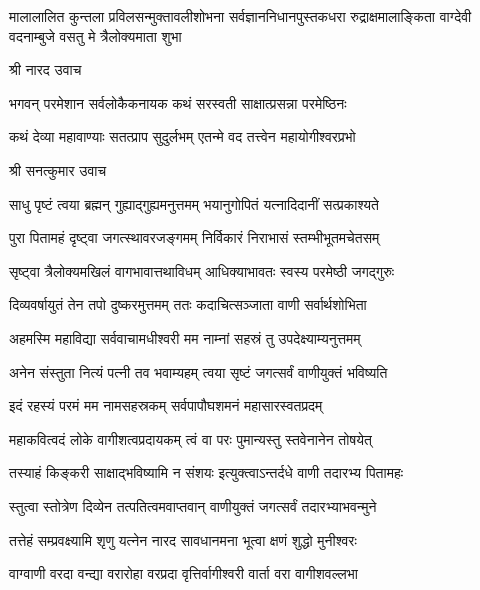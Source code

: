
{मालालालित कुन्तला प्रविलसन्मुक्तावलीशोभना}
{सर्वज्ञाननिधानपुस्तकधरा रुद्राक्षमालाङ्किता}
{वाग्देवी वदनाम्बुजे वसतु मे त्रैलोक्यमाता शुभा}

श्री नारद उवाच\nopagebreak[4]

\twolineshloka
{भगवन् परमेशान सर्वलोकैकनायक}
{कथं सरस्वती साक्षात्प्रसन्ना परमेष्ठिनः}%

\twolineshloka
{कथं देव्या महावाण्याः सतत्प्राप सुदुर्लभम्}
{एतन्मे वद तत्त्वेन महायोगीश्वरप्रभो}%


श्री सनत्कुमार उवाच\nopagebreak[4]

\twolineshloka
{साधु पृष्टं त्वया ब्रह्मन् गुह्याद्गुह्यमनुत्तमम्}
{भयानुगोपितं यत्नादिदानीं सत्प्रकाश्यते}%

\twolineshloka
{पुरा पितामहं दृष्ट्वा जगत्स्थावरजङ्गमम्}
{निर्विकारं निराभासं स्तम्भीभूतमचेतसम्}%

\twolineshloka
{सृष्ट्वा त्रैलोक्यमखिलं वागभावात्तथाविधम्}
{आधिक्याभावतः स्वस्य परमेष्ठी जगद्गुरुः}%

\twolineshloka
{दिव्यवर्षायुतं तेन तपो दुष्करमुत्तमम्}
{ततः कदाचित्सञ्जाता वाणी सर्वार्थशोभिता}%

\twolineshloka
{अहमस्मि महाविद्या सर्ववाचामधीश्वरी}
{मम नाम्नां सहस्रं तु उपदेक्ष्याम्यनुत्तमम्}%

\twolineshloka
{अनेन संस्तुता नित्यं पत्नी तव भवाम्यहम्}
{त्वया सृष्टं जगत्सर्वं वाणीयुक्तं भविष्यति}%

\twolineshloka
{इदं रहस्यं परमं मम नामसहस्रकम्}
{सर्वपापौघशमनं महासारस्वतप्रदम्}%

\twolineshloka
{महाकवित्वदं लोके वागीशत्वप्रदायकम्}
{त्वं वा परः पुमान्यस्तु स्तवेनानेन तोषयेत्}%

\twolineshloka
{तस्याहं किङ्करी साक्षाद्भविष्यामि न संशयः}
{इत्युक्त्वाऽन्तर्दधे वाणी तदारभ्य पितामहः}%

\twolineshloka
{स्तुत्वा स्तोत्रेण दिव्येन तत्पतित्वमवाप्तवान्}
{वाणीयुक्तं जगत्सर्वं तदारभ्याभवन्मुने}%

\twolineshloka
{तत्तेहं सम्प्रवक्ष्यामि शृणु यत्नेन नारद}
{सावधानमना भूत्वा क्षणं शुद्धो मुनीश्वरः}%




 \resetShloka


\twolineshloka
{वाग्वाणी वरदा वन्द्या वरारोहा वरप्रदा}
{वृत्तिर्वागीश्वरी वार्ता वरा वागीशवल्लभा}%


